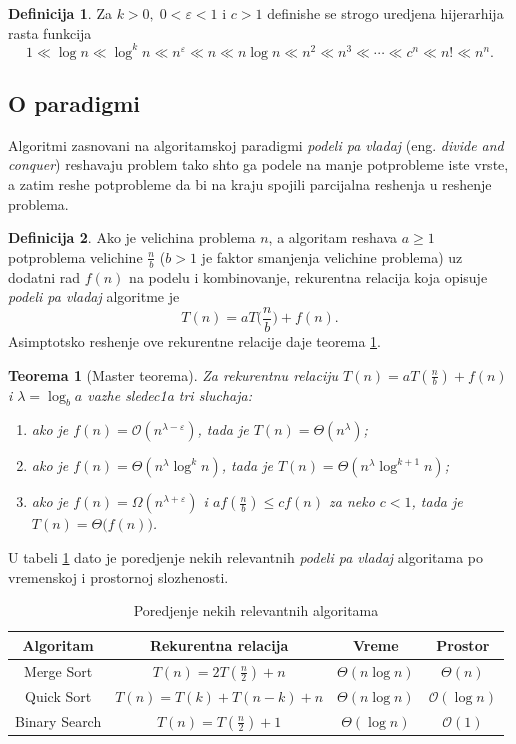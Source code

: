 \documentclass{article}
\newcommand{\lat}{\fontencoding{OT1}\fontfamily{cmr}\selectfont}
\newtheorem{teorema}{Teorema}[section]
\theoremstyle{definition}
\newtheorem{definicija}{Definicija}[section]
\begin{document}
\begin{definicija}
Za $k>0,\;0<\varepsilon<1$ i $c>1$ definishe se strogo uredjena hijerarhija rasta funkcija $$1 \ll \log n \ll \log^k n \ll n^\varepsilon \ll n \ll n\log n \ll n^2 \ll n^3 \ll \cdots \ll c^n \ll n! \ll n^n.$$
\end{definicija}

\subsection{O paradigmi}
Algoritmi zasnovani na algoritamskoj paradigmi \emph{podeli pa vladaj} (eng. \emph{\lat divide and conquer}) reshavaju problem tako shto ga podele na manje potprobleme iste vrste, a zatim reshe potprobleme da bi na kraju spojili parcijalna reshenja u reshenje problema.

\begin{definicija}
Ako je velichina problema $n$, a algoritam reshava $a\geqslant 1$ potproblema velichine $\frac{n}{b}$ ($b>1$ je faktor smanjenja velichine problema) uz dodatni rad $f(n)$ na podelu i kombinovanje, rekurentna relacija koja opisuje \emph{podeli pa vladaj} algoritme je $$T(n) = aT\Big(\frac{n}{b}\Big) + f(n).$$ Asimptot{}sko reshenje ove rekurentne relacije daje teorema \ref{thm:master}.
\end{definicija}

\begin{teorema}[Master teorema]
\label{thm:master}
Za rekurentnu relaciju $T(n) = aT(\frac{n}{b}) + f(n)$ i $\lambda = \log_b a$ vazhe sledec1a tri sluchaja:
\begin{enumerate}
\item ako je $f(n) = \mathcal{O}(n^{\lambda - \varepsilon})$, tada je $T(n)=\Theta(n^\lambda)$;
\item ako je $f(n) = \Theta(n^\lambda \log^k n)$, tada je $T(n) = \Theta(n^\lambda \log^{k+1} n)$;
\item ako je $f(n) = \Omega(n^{\lambda + \varepsilon})$ i $af(\frac{n}{b}) \leqslant cf(n)$ za neko $c<1$, tada je $T(n) = \Theta\big(f(n)\big)$.
\end{enumerate}
\end{teorema}

U tabeli \ref{tab:poredjenje} dato je poredjenje nekih relevantnih \emph{podeli pa vladaj} algoritama po vremenskoj i prostornoj slozhenosti.

\begin{table}[h]
\centering
\begin{tabular}{c||c|c|c}
\textbf{Algoritam} & \textbf{Rekurentna relacija} & \textbf{Vreme} & \textbf{Prostor}\\ \hline
{\lat Merge Sort} & $T(n) = 2T(\frac{n}{2})+n$ & $\Theta(n\log n)$ & $\Theta(n)$\\
{\lat Quick Sort} & $T(n) = T(k)+T(n-k)+n$ & $\Theta(n\log n)$ & $\mathcal{O}(\log n)$\\
{\lat Binary Search} & $T(n) = T(\frac{n}{2})+1$ & $\Theta(\log n)$ & $\mathcal{O}(1)$
\end{tabular}
\caption{Poredjenje nekih relevantnih algoritama}
\label{tab:poredjenje}
\end{table}
\end{document}
